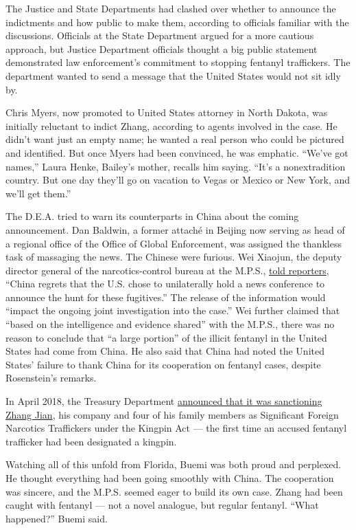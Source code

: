 The Justice and State Departments had clashed over whether to announce
the indictments and how public to make them, according to officials
familiar with the discussions. Officials at the State Department argued
for a more cautious approach, but Justice Department officials thought a
big public statement demonstrated law enforcement's commitment to
stopping fentanyl traffickers. The department wanted to send a message
that the United States would not sit idly by.

Chris Myers, now promoted to United States attorney in North Dakota, was
initially reluctant to indict Zhang, according to agents involved in the
case. He didn't want just an empty name; he wanted a real person who
could be pictured and identified. But once Myers had been convinced, he
was emphatic. ``We've got names,'' Laura Henke, Bailey's mother, recalls
him saying. ``It's a nonextradition country. But one day they'll go on
vacation to Vegas or Mexico or New York, and we'll get them.''

The D.E.A. tried to warn its counterparts in China about the coming
announcement. Dan Baldwin, a former attaché in Beijing now serving as
head of a regional office of the Office of Global Enforcement, was
assigned the thankless task of massaging the news. The Chinese were
furious. Wei Xiaojun, the deputy director general of the
narcotics-control bureau at the M.P.S.,
\href{https://www.nytimes3xbfgragh.onion/2017/11/03/world/asia/china-opioid-fentanyl-trump.html}{told
reporters}, ``China regrets that the U.S. chose to unilaterally hold a
news conference to announce the hunt for these fugitives.'' The release
of the information would ``impact the ongoing joint investigation into
the case.'' Wei further claimed that ``based on the intelligence and
evidence shared'' with the M.P.S., there was no reason to conclude that
``a large portion'' of the illicit fentanyl in the United States had
come from China. He also said that China had noted the United States'
failure to thank China for its cooperation on fentanyl cases, despite
Rosenstein's remarks.

In April 2018, the Treasury Department
\href{https://home.treasury.gov/news/press-releases/sm0372}{announced
that it was sanctioning Zhang Jian}, his company and four of his family
members as Significant Foreign Narcotics Traffickers under the Kingpin
Act --- the first time an accused fentanyl trafficker had been
designated a kingpin.

Watching all of this unfold from Florida, Buemi was both proud and
perplexed. He thought everything had been going smoothly with China. The
cooperation was sincere, and the M.P.S. seemed eager to build its own
case. Zhang had been caught with fentanyl --- not a novel analogue, but
regular fentanyl. ``What happened?'' Buemi said.

